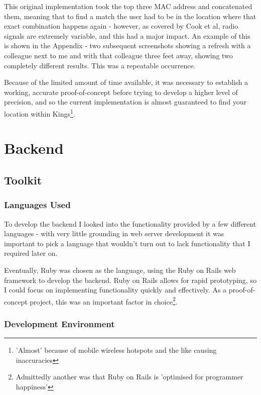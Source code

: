 \documentclass[11pt]{informatics-report}
\begin{document}
This original implementation took the top three MAC address and concatenated them, meaning that to find a match the user had to be in the location where that exact combination happens again - however, as covered by Cook et al, radio signals are extremely variable\cite{cook2005indoor}, and this had a major impact. An example of this is shown in the Appendix - two subsequent screenshots showing a refresh with a colleague next to me and with that colleague three feet away, showing two completely different results. This was a repeatable occurrence. 

Because of the limited amount of time available, it was necessary to establish a working, accurate proof-of-concept before trying to develop a higher level of precision, and so the current implementation is almost guaranteed to find your location within Kings\footnote{ 'Almost' because of mobile wireless hotspots and the like causing inaccuracies }. 

\section{Backend}

\subsection{Toolkit}

\subsubsection{Languages Used}

To develop the backend I looked into the functionality provided by a few different languages - with very little grounding in web server development it was important to pick a language that wouldn't turn out to lack functionality that I required later on.

Eventually, Ruby was chosen as the language, using the Ruby on Rails web framework to develop the backend. Ruby on Rails allows for rapid prototyping, so I could focus on implementing functionality quickly and effectively. As a proof-of-concept project, this was an important factor in choice\footnote{Admittedly another was that Ruby on Rails is 'optimised for programmer happiness'}.

\subsubsection{Development Environment}
\end{document}
